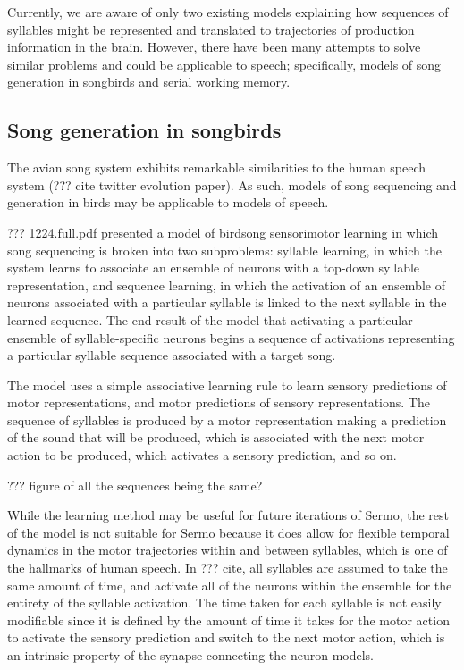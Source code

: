 Currently,
we are aware of only two existing models
explaining how sequences of syllables
might be represented
and translated to trajectories of
production information in the brain.
However, there have been many attempts
to solve similar problems
and could be applicable to speech;
specifically,
models of song generation in songbirds
and serial working memory.

\subsection{Song generation in songbirds}

The avian song system
exhibits remarkable similarities
to the human speech system
(??? cite twitter evolution paper).
As such, models of song sequencing
and generation in birds
may be applicable to models of speech.

??? 1224.full.pdf presented a model
of birdsong sensorimotor learning
in which song sequencing is broken
into two subproblems:
syllable learning,
in which the system learns
to associate an ensemble of neurons
with a top-down syllable representation,
and sequence learning,
in which the activation
of an ensemble of neurons
associated with a particular syllable
is linked to the next syllable
in the learned sequence.
The end result of the model
that activating a particular
ensemble of syllable-specific neurons
begins a sequence of activations
representing a particular syllable sequence
associated with a target song.

The model uses a
simple associative learning rule
to learn sensory predictions
of motor representations,
and motor predictions
of sensory representations.
The sequence of syllables is produced
by a motor representation
making a prediction of the
sound that will be produced,
which is associated with
the next motor action to be produced,
which activates a sensory prediction,
and so on.

??? figure of all the sequences being the same?

While the learning method
may be useful for future iterations of Sermo,
the rest of the model is not suitable for Sermo
because it does allow for
flexible temporal dynamics
in the motor trajectories within and between syllables,
which is one of the hallmarks of human speech.
In ??? cite, all syllables are assumed
to take the same amount of time,
and activate all of the neurons
within the ensemble for the entirety
of the syllable activation.
The time taken for each syllable
is not easily modifiable since
it is defined by the amount of time
it takes for the motor action
to activate the sensory prediction
and switch to the next motor action,
which is an intrinsic property
of the synapse connecting the neuron models.

